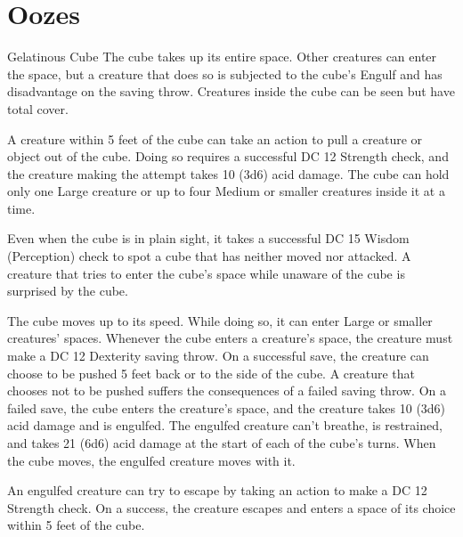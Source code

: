 \clearpage
\section{Oozes}

\begin{DndMonster}{Gelatinous Cube}
	\DndMonsterBasics[armor-class={6}, hit-points={84 (8d10 + 40)}, speed={15 ft.}]
	\DndMonsterDetails[saving-throws={}, skills={}, damage-immunities={acid}, damage-resistances={}, damage-vulnerabilities={}, condition-immunities={blinded, charmed, deafened, exhaustion, frightened, prone}, senses={blindsight 60 ft. (blind beyond this radius), passive Perception 8}, languages={—}, challenge={3:2}]
	 The cube takes up its entire space. Other creatures can enter the space, but a creature that does so is subjected to the cube's Engulf and has disadvantage on the saving throw. Creatures inside the cube can be seen but have total cover.
	
	A creature within 5 feet of the cube can take an action to pull a creature or object out of the cube. Doing so requires a successful DC 12 Strength check, and the creature making the attempt takes 10 (3d6) acid damage. The cube can hold only one Large creature or up to four Medium or smaller creatures inside it at a time.
	
	 Even when the cube is in plain sight, it takes a successful DC 15 Wisdom (Perception) check to spot a cube that has neither moved nor attacked. A creature that tries to enter the cube's space while unaware of the cube is surprised by the cube.
	
	\DndMonsterAttack[
		name=Pseudopod,
		distance=melee,
		type=weapon,
		mod=+4,
		reach=5,
		dmg=\DndDice{3d6},
		dmg-type=acid
	]
	The cube moves up to its speed. While doing so, it can enter Large or smaller creatures' spaces. Whenever the cube enters a creature's space, the creature must make a DC 12 Dexterity saving throw. On a successful save, the creature can choose to be pushed 5 feet back or to the side of the cube. A creature that chooses not to be pushed suffers the consequences of a failed saving throw. On a failed save, the cube enters the creature's space, and the creature takes 10 (3d6) acid damage and is engulfed. The engulfed creature can't breathe, is restrained, and takes 21 (6d6) acid damage at the start of each of the cube's turns. When the cube moves, the engulfed creature moves with it.
	
	An engulfed creature can try to escape by taking an action to make a DC 12 Strength check. On a success, the creature escapes and enters a space of its choice within 5 feet of the cube.
	\end{DndMonster}


